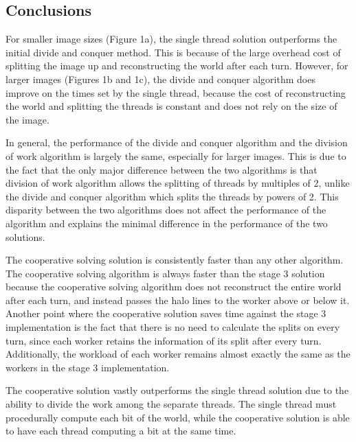 \documentclass[10pt,a4paper,dvipsnames,cmyk]{scrartcl}
\begin{document}
\begin{samepage}
\subsection*{Conclusions}%
\label{sub:Conclusions}
For smaller image sizes (Figure 1a), the single thread solution
outperforms the initial divide and conquer method. This is because of the
large overhead cost of splitting the image up and reconstructing the world
after each turn.  However, for larger images (Figures 1b and 1c), the
divide and conquer algorithm does improve on the times set by the single
thread, because the cost of reconstructing the world and splitting the
threads is constant and does not rely on the size of the image.

In general, the performance of the divide and conquer algorithm and the
division of work algorithm is largely the same, especially for larger
images. This is due to the fact that the only major difference between the
two algorithms is that division of work algorithm allows the splitting of
threads by multiples of 2, unlike the divide and conquer algorithm which
splits the threads by powers of 2. This disparity between the two algorithms
does not affect the performance of the algorithm and explains the minimal
difference in the performance of the two solutions.

The cooperative solving solution is consistently faster than any other
algorithm. The cooperative solving algorithm is always faster than the
stage 3 solution because the cooperative solving algorithm does not
reconstruct the entire world after each turn, and instead passes the halo
lines to the worker above or below it. Another point where the cooperative
solution saves time against the stage 3 implementation is the fact that
there is no need to calculate the splits on every turn, since each worker
retains the information of its split after every turn. Additionally, the
workload of each worker remains almost exactly the same as the workers in
the stage 3 implementation.

The cooperative solution vastly outperforms the single thread solution due
to the ability to divide the work among the separate threads. The single
thread must procedurally compute each bit of the world, while the
cooperative solution is able to have each thread computing a bit at the
same time.
\end{samepage}
\end{document}
